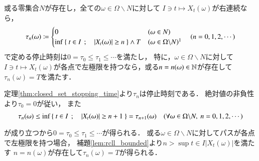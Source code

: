 	\begin{screen}
		\begin{lem}[右連続関数で導入する停止時刻の単調性]
			或る零集合$N$が存在し，全ての$\omega \in \Omega \backslash N$に対して
			$I \ni t \longmapsto X_t(\omega)$が右連続なら，
			\begin{align}
				\tau_n(\omega) \coloneqq
				\begin{cases}
					0 & (\omega \in N) \\
					\inf{}{\Set{t \in I}{|X_t(\omega)| \geq n}} \wedge T & (\omega \in \Omega \backslash N) \footnotemark
				\end{cases}
				\quad (n=0,1,2,\cdots)
			\end{align}
			で定める停止時刻は$0 = \tau_0 \leq \tau_1 \leq \cdots$を満たし，
			特に，$\omega \in \Omega \backslash N$に対して
			$I \ni t \longmapsto X_t(\omega)$が各点で左極限を持つなら，或る$n = n(\omega) \in \mathbb{N}$が存在して
			$\tau_n(\omega) = T$を満たす．
			\label{lem:right_continuous_stopping_time_monotonous}
		\end{lem}
	\end{screen}
	\begin{prf}
		定理\ref{thm:closed_set_stopping_time}より$\tau_n$は停止時刻である．
		絶対値の非負性より$\tau_0 = 0$が従い，
		また
		\begin{align}
			\tau_{n}(\omega) \leq \inf{}{\Set{t \in I}{|X_t(\omega)| \geq n+1}} = \tau_{n+1}(\omega)
			\quad (\forall \omega \in \Omega \backslash N,\ n=0,1,2,\cdots)
		\end{align}
		が成り立つから$0 = \tau_0 \leq \tau_1 \leq \cdots$が得られる．
		或る$\omega \in \Omega \backslash N$に対してパスが各点で左極限を持つ場合，
		補題\ref{lem:rcll_bounded}より$n > \sup{t \in I}{|X_t(\omega)|}$を満たす
		$n = n(\omega)$が存在して$\tau_n(\omega) = T$が得られる．
		\QED
	\end{prf}
	
